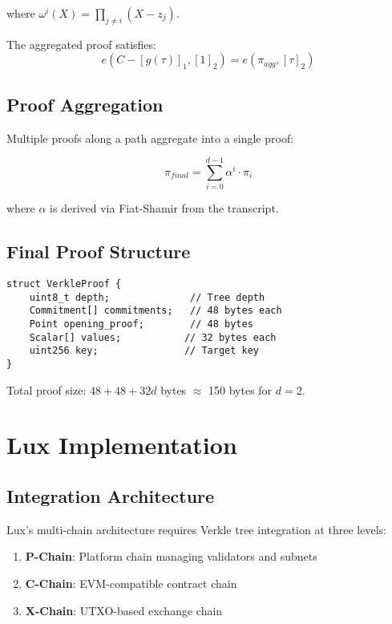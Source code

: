 \documentclass[11pt,a4paper]{article}
\theoremstyle{definition}
\begin{document}
where $\omega^i(X) = \prod_{j \neq i}(X - z_j)$.

The aggregated proof satisfies:
\begin{equation}
    e(C - [g(\tau)]_1, [1]_2) = e(\pi_{agg}, [\tau]_2)
\end{equation}

\subsection{Proof Aggregation}

Multiple proofs along a path aggregate into a single proof:

\begin{equation}
    \pi_{final} = \sum_{i=0}^{d-1} \alpha^i \cdot \pi_i
\end{equation}

where $\alpha$ is derived via Fiat-Shamir from the transcript.

\subsection{Final Proof Structure}

\begin{lstlisting}[caption=Verkle Proof Format]
struct VerkleProof {
    uint8_t depth;              // Tree depth
    Commitment[] commitments;   // 48 bytes each
    Point opening_proof;        // 48 bytes
    Scalar[] values;           // 32 bytes each
    uint256 key;               // Target key
}
\end{lstlisting}

Total proof size: $48 + 48 + 32d$ bytes $\approx$ 150 bytes for $d = 2$.

\section{Lux Implementation}

\subsection{Integration Architecture}

Lux's multi-chain architecture requires Verkle tree integration at three levels:

\begin{enumerate}
    \item \textbf{P-Chain}: Platform chain managing validators and subnets
    \item \textbf{C-Chain}: EVM-compatible contract chain
    \item \textbf{X-Chain}: UTXO-based exchange chain
\end{enumerate}
\end{document}
